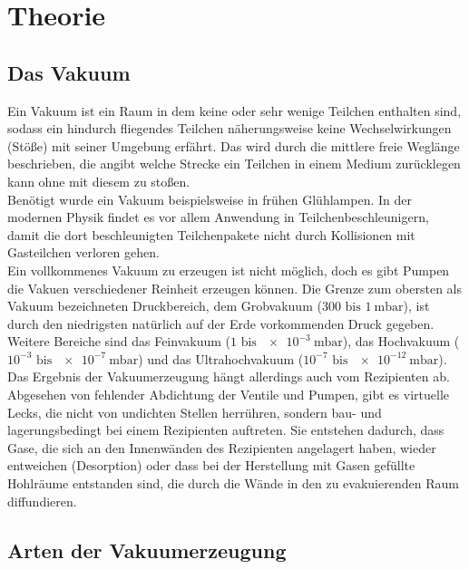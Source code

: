 
\section{Theorie}
\label{sec:Theorie}

\subsection{Das Vakuum}

Ein Vakuum ist ein Raum in dem keine oder sehr wenige Teilchen enthalten sind, sodass ein hindurch fliegendes Teilchen näherungsweise keine Wechselwirkungen (Stöße) mit seiner Umgebung erfährt. Das wird durch die mittlere freie Weglänge beschrieben, die angibt welche Strecke ein Teilchen in einem Medium zurücklegen kann ohne mit diesem zu stoßen.\\
Benötigt wurde ein Vakuum beispielsweise in frühen Glühlampen. In der modernen Physik findet es vor allem Anwendung in Teilchenbeschleunigern, damit die dort beschleunigten Teilchenpakete nicht durch Kollisionen mit Gasteilchen verloren gehen.\\
Ein vollkommenes Vakuum zu erzeugen ist nicht möglich, doch es gibt Pumpen die Vakuen verschiedener Reinheit erzeugen können. Die Grenze zum obersten als Vakuum bezeichneten Druckbereich, dem Grobvakuum ($300 \text{ bis } \SI{1}{\milli\bar}$), ist durch den niedrigsten natürlich auf der Erde vorkommenden Druck gegeben. Weitere Bereiche sind das Feinvakuum ($1 \text{ bis } \SI{e-3}{\milli\bar}$), das Hochvakuum ($10^{-3} \text{ bis } \SI{e-7}{\milli\bar}$) und das Ultrahochvakuum ($10^{-7} \text{ bis } \SI{e-12}{\milli\bar}$).\\
Das Ergebnis der Vakuumerzeugung hängt allerdings auch vom Rezipienten ab. Abgesehen von fehlender Abdichtung der Ventile und Pumpen, gibt es virtuelle Lecks, die nicht von undichten Stellen herrühren, sondern bau- und lagerungsbedingt bei einem Rezipienten auftreten. Sie entstehen dadurch, dass Gase, die sich an den Innenwänden des Rezipienten angelagert haben, wieder entweichen (Desorption) oder dass bei der Herstellung mit Gasen gefüllte Hohlräume entstanden sind, die durch die Wände in den zu evakuierenden Raum diffundieren.

\subsection{Arten der Vakuumerzeugung}

